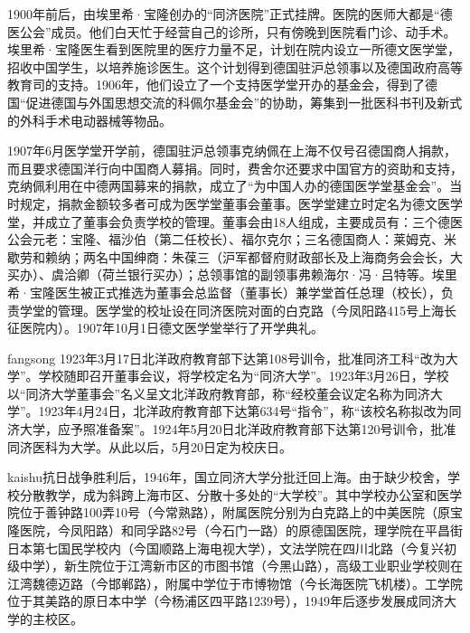 {\songti 

1900年前后，由埃里希·宝隆创办的“同济医院”正式挂牌。医院的医师大都是“德医公会”成员。他们白天忙于经营自己的诊所，只有傍晚到医院看门诊、动手术。埃里希·宝隆医生看到医院里的医疗力量不足，计划在院内设立一所德文医学堂，招收中国学生，以培养施诊医生。这个计划得到德国驻沪总领事以及德国政府高等教育司的支持。1906年，他们设立了一个支持医学堂开办的基金会，得到了德国“促进德国与外国思想交流的科佩尔基金会”的协助，筹集到一批医科书刊及新式的外科手术电动器械等物品。}

{\heiti 1907年6月医学堂开学前，德国驻沪总领事克纳佩在上海不仅号召德国商人捐款，而且要求德国洋行向中国商人募捐。同时，费舍尔还要求中国官方的资助和支持，克纳佩利用在中德两国募来的捐款，成立了“为中国人办的德国医学堂基金会”。当时规定，捐款金额较多者可成为医学堂董事会董事。医学堂建立时定名为德文医学堂，并成立了董事会负责学校的管理。董事会由18人组成，主要成员有：三个德医公会元老：宝隆、福沙伯（第二任校长）、福尔克尔；三名德国商人：莱姆克、米歇劳和赖纳；两名中国绅商：朱葆三（沪军都督府财政部长及上海商务会会长，大买办）、虞洽卿（荷兰银行买办）；总领事馆的副领事弗赖海尔·冯·吕特等。埃里希·宝隆医生被正式推选为董事会总监督（董事长）兼学堂首任总理（校长），负责学堂的管理。医学堂的校址设在同济医院对面的白克路（今凤阳路415号上海长征医院内）。1907年10月1日德文医学堂举行了开学典礼。}

{\ifcsname fangsong\endcsname\fangsong\else[无 \cs{fangsong} 字体。]\fi 
1923年3月17日北洋政府教育部下达第108号训令，批准同济工科“改为大学”。学校随即召开董事会议，将学校定名为“同济大学”。1923年3月26日，学校以“同济大学董事会”名义呈文北洋政府教育部，称“经校董会议定名称为同济大学”。1923年4月24日，北洋政府教育部下达第634号“指令”，称“该校名称拟改为同济大学，应予照准备案”。1924年5月20日北洋政府教育部下达第120号训令，批准同济医科为大学。从此以后，5月20日定为校庆日。}

{\ifcsname kaishu\endcsname\kaishu\else[无 \cs{kaishu} 字体。]\fi 抗日战争胜利后，1946年，国立同济大学分批迁回上海。由于缺少校舍，学校分散教学，成为斜跨上海市区、分散十多处的“大学校”。其中学校办公室和医学院位于善钟路100弄10号（今常熟路），附属医院分别为白克路上的中美医院（原宝隆医院，今凤阳路）和同孚路82号（今石门一路）的原德国医院，理学院在平昌街日本第七国民学校内（今国顺路上海电视大学），文法学院在四川北路（今复兴初级中学），新生院位于江湾新市区的市图书馆（今黑山路），高级工业职业学校则在江湾魏德迈路（今邯郸路），附属中学位于市博物馆（今长海医院飞机楼）。工学院位于其美路的原日本中学（今杨浦区四平路1239号），1949年后逐步发展成同济大学的主校区。}


